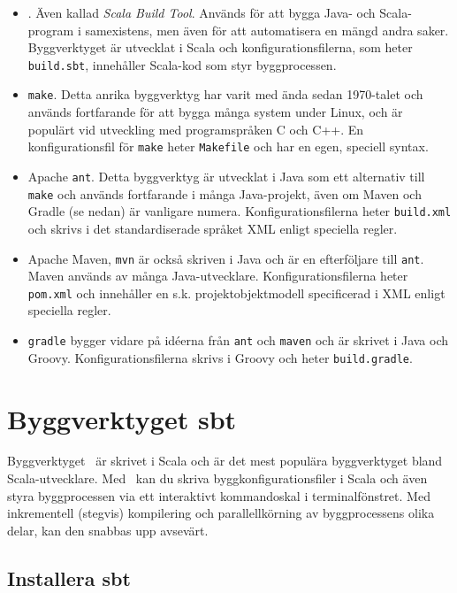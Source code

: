 \begin{itemize}
\item \sbt. Även kallad \textit{Scala Build Tool}. Används för att bygga Java- och Scala-program i samexistens, men även för att automatisera en mängd andra saker. Byggverktyget är utvecklat i Scala och konfigurationsfilerna, som heter \texttt{build.sbt}, innehåller Scala-kod som styr byggprocessen.

\item \texttt{make}. Detta anrika byggverktyg har varit med ända sedan 1970-talet och används fortfarande för att bygga många system under Linux, och är populärt vid utveckling med programspråken C och C++. En konfigurationsfil för \texttt{make} heter \texttt{Makefile} och har en egen, speciell syntax.

\item Apache \texttt{ant}. Detta byggverktyg är utvecklat i Java som ett alternativ till \texttt{make} och används fortfarande i många Java-projekt, även om Maven och Gradle (se nedan) är vanligare numera. Konfigurationsfilerna heter \texttt{build.xml} och skrivs i det standardiserade språket XML enligt  speciella regler.

\item Apache Maven, \texttt{mvn} är också skriven i Java och är en efterföljare till \texttt{ant}. Maven används av många Java-utvecklare. Konfigurationsfilerna heter \texttt{pom.xml} och innehåller en s.k. projektobjektmodell specificerad i XML enligt  speciella regler.

\item \texttt{gradle} bygger vidare på idéerna från \texttt{ant} och \texttt{maven} och är skrivet i Java och Groovy.  Konfigurationsfilerna skrivs i Groovy och heter \texttt{build.gradle}.

\end{itemize}

\section{Byggverktyget sbt}

Byggverktyget \sbt\ är skrivet i Scala och är det mest populära byggverktyget bland Scala-utvecklare. Med \sbt\ kan du skriva byggkonfigurationsfiler i Scala och även styra byggprocessen via ett interaktivt kommandoskal i terminalfönstret. Med inkrementell (stegvis) kompilering och parallellkörning av byggprocessens olika delar, kan den snabbas upp avsevärt.


\subsection{Installera sbt}

